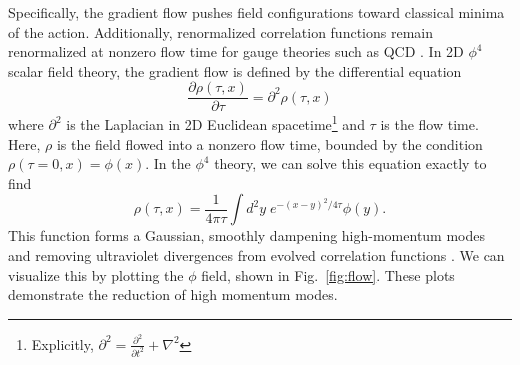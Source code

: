 Specifically, the gradient flow pushes field configurations toward classical minima of the action. Additionally, renormalized correlation functions remain renormalized at nonzero flow time for gauge theories such as QCD \cite{luscher2013}. In 2D $\phi^4$ scalar field theory, the gradient flow is defined by the differential equation 
\begin{equation}
    \frac{\partial \rho(\tau, x)}{\partial \tau} = \partial^2 \rho(\tau,x)
\end{equation}
where $\partial^2$ is the Laplacian in 2D Euclidean spacetime\footnote{Explicitly, $\partial^2 = \frac{\partial^2}{\partial t^2} + \nabla^2$} and $\tau$ is the flow time. Here, $\rho$ is the field flowed into a nonzero flow time, bounded by the condition $\rho(\tau=0,x) = \phi(x)$. In the $\phi^4$ theory, we can solve this equation exactly to find \cite{monahan2016}
\begin{equation}
    \rho(\tau, x) = \frac{1}{4 \pi \tau} \int d^2 y \; e^{-(x-y)^2/4\tau} \phi(y).
\end{equation}
This function forms a Gaussian, smoothly dampening high-momentum modes and removing ultraviolet divergences from evolved correlation functions \cite{makino2015a}. We can visualize this by plotting the $\phi$ field, shown in Fig.~\ref{fig:flow}. These plots demonstrate the reduction of high momentum modes.
